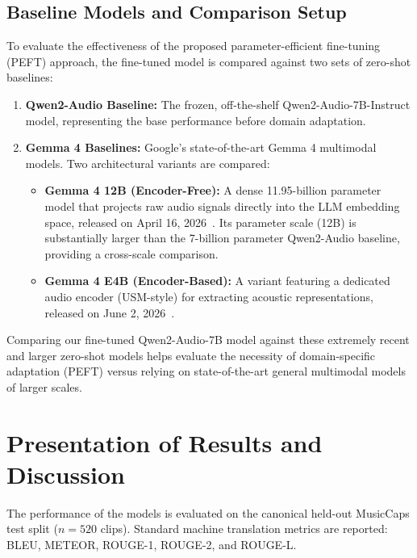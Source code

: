 \documentclass[12pt, conference, letterpaper]{IEEEtran}
\begin{document}
\subsection{Baseline Models and Comparison Setup}
To evaluate the effectiveness of the proposed parameter-efficient fine-tuning (PEFT) approach, the fine-tuned model is compared against two sets of zero-shot baselines:
\begin{enumerate}
    \item \textbf{Qwen2-Audio Baseline:} The frozen, off-the-shelf Qwen2-Audio-7B-Instruct model, representing the base performance before domain adaptation.
    \item \textbf{Gemma 4 Baselines:} Google's state-of-the-art Gemma 4 multimodal models. Two architectural variants are compared:
          \begin{itemize}
              \item \textbf{Gemma 4 12B (Encoder-Free):} A dense 11.95-billion parameter model that projects raw audio signals directly into the LLM embedding space, released on April 16, 2026~\cite{gemma4}. Its parameter scale (12B) is substantially larger than the 7-billion parameter Qwen2-Audio baseline, providing a cross-scale comparison.
              \item \textbf{Gemma 4 E4B (Encoder-Based):} A variant featuring a dedicated audio encoder (USM-style) for extracting acoustic representations, released on June 2, 2026~\cite{gemma4}.
          \end{itemize}
\end{enumerate}
Comparing our fine-tuned Qwen2-Audio-7B model against these extremely recent and larger zero-shot models helps evaluate the necessity of domain-specific adaptation (PEFT) versus relying on state-of-the-art general multimodal models of larger scales.

\section{Presentation of Results and Discussion}
\label{sec:results}

The performance of the models is evaluated on the canonical held-out MusicCaps test split ($n=520$ clips). Standard machine translation metrics are reported: BLEU, METEOR, ROUGE-1, ROUGE-2, and ROUGE-L.
\end{document}
